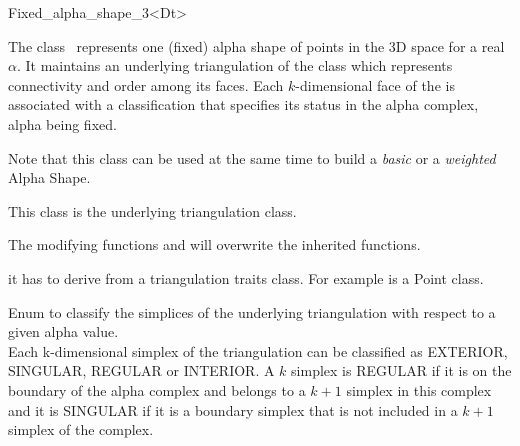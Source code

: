 
\begin{ccRefClass} {Fixed_alpha_shape_3<Dt>}

\ccDefinition

The class \ccClassTemplateName\ represents one (fixed)
alpha shape of points in the 3D space for a real
$\alpha$. It maintains an  underlying triangulation 
of the class  which
represents connectivity and order among its faces. Each
$k$-dimensional face of the  is associated with
a classification that specifies its status in the alpha complex, alpha being fixed.

Note that this class can be used at the same time to build a {\em basic} or
a {\em weighted} Alpha Shape.



\ccInheritsFrom


This class is the underlying triangulation class.

The modifying functions  and  will overwrite
the inherited functions.

\ccTypes
{}
\ccThreeToTwo

it has to derive from a triangulation traits class.  
For example  is a Point class. 




{Enum to classify the simplices of the underlying 
triangulation with respect to a given alpha value.\\ 
Each k-dimensional simplex of the triangulation
can be classified as EXTERIOR, SINGULAR, REGULAR
or INTERIOR.
A $k$ simplex is REGULAR if it is on the boundary
of the alpha complex and belongs to a $k+1$ simplex in this complex
and it is SINGULAR  if it is  a boundary simplex that is not included in a $k+1$ simplex of the complex. \\  
}





\end{ccRefClass}
